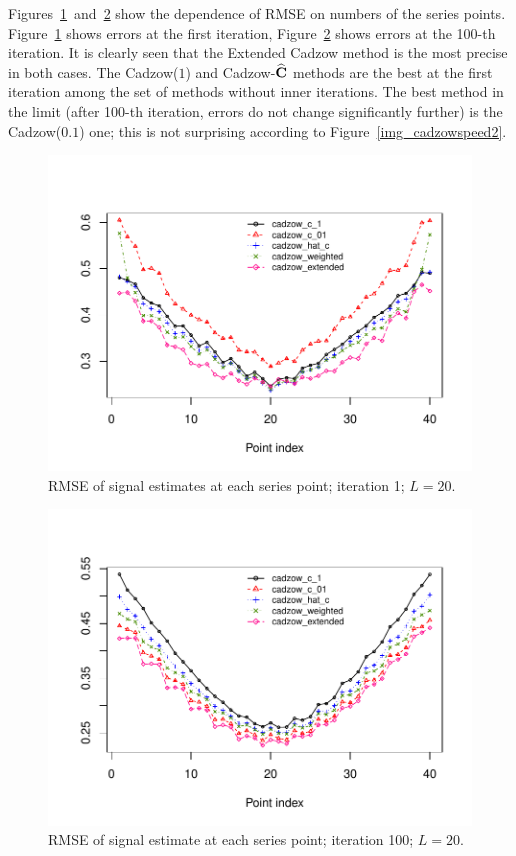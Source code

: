 \documentclass[sii]{ipart}
\begin{document}
Figures~\ref{fig:s1_it1}~and~\ref{fig:s1_it100} show the dependence of RMSE on numbers of the series points. Figure~\ref{fig:s1_it1} shows errors at the first iteration, Figure~\ref{fig:s1_it100} shows errors at the 100-th iteration. It is clearly seen that the Extended Cadzow method is the most precise in both cases. The Cadzow($1$) and Cadzow-$\widehat{\mathbf{C}}$ methods are the best at the first iteration among the set of methods without inner iterations. The best method in the limit (after 100-th iteration, errors do not change significantly further) is the Cadzow($0.1$) one; this is not surprising according to Figure~\ref{img_cadzowspeed2}.

\begin{figure}[!hhh]
		\includegraphics[width = \columnwidth]{s1_it1.pdf}
		\caption{RMSE of signal estimates at each series point; iteration 1; $L=20$.}
		\label{fig:s1_it1}
\end{figure}

\begin{figure}[!hhh]
		\includegraphics[width = \columnwidth]{s1_it100.pdf}
		\caption{RMSE of signal estimate at each series point; iteration 100; $L=20$.}
		\label{fig:s1_it100}
\end{figure}
\end{document}
